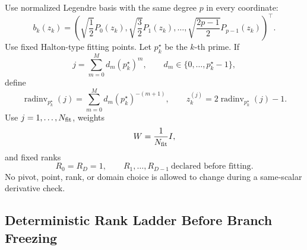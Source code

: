 \documentclass[11pt]{article}
\numberwithin{equation}{section}
\begin{document}
Use normalized Legendre basis with the same degree \(p\) in every coordinate:
\begin{equation}
    b_k(z_k)=
    \left(
    \sqrt{\frac12}P_0(z_k),
    \sqrt{\frac32}P_1(z_k),
    \ldots,
    \sqrt{\frac{2p-1}{2}}P_{p-1}(z_k)
    \right)^\top.
    \label{eq:p24-c3}
\end{equation}
Use fixed Halton-type fitting points.  Let \(p_k^\star\) be the \(k\)-th prime.
If
\[
    j=\sum_{m=0}^{M}d_m(p_k^\star)^m,\qquad
    d_m\in\{0,\ldots,p_k^\star-1\},
\]
define
\begin{equation}
    \operatorname{radinv}_{p_k^\star}(j)
    =
    \sum_{m=0}^{M}d_m(p_k^\star)^{-(m+1)},
    \qquad
    z_k^{(j)}=2\operatorname{radinv}_{p_k^\star}(j)-1.
    \label{eq:p24-c4}
\end{equation}
Use \(j=1,\ldots,N_{\rm fit}\), weights
\begin{equation}
    W=\frac1{N_{\rm fit}}I,
    \label{eq:p24-c5}
\end{equation}
and fixed ranks
\begin{equation}
    R_0=R_D=1,\qquad R_1,\ldots,R_{D-1}\ \text{declared before fitting}.
    \label{eq:p24-c6}
\end{equation}
No pivot, point, rank, or domain choice is allowed to change during a
same-scalar derivative check.

\subsection{Deterministic Rank Ladder Before Branch Freezing}
\end{document}

